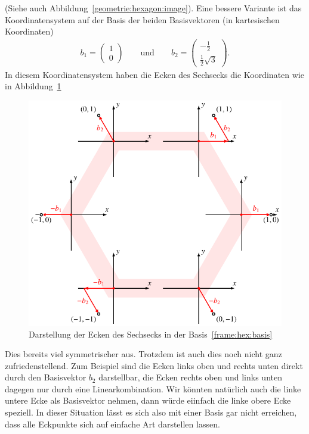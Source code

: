 (Siehe auch Abbildung~\ref{geometrie:hexagon:image}).
Eine bessere Variante ist das Koordinatensystem auf der Basis der beiden
Basisvektoren (in kartesischen Koordinaten)
\begin{equation}
\begin{aligned}
b_1 = \begin{pmatrix} 1\\0\end{pmatrix}
\qquad
\text{und}
\qquad
b_2 = \begin{pmatrix} -\frac12\\\frac12\sqrt{3}\end{pmatrix}.
\end{aligned}
\label{frame:hex:basis}
\end{equation}
In diesem Koordinatensystem haben die Ecken des Sechsecks die Koordinaten
wie in Abbildung~\ref{frame:hex:basisanalyse}
\begin{figure}
\centering
\includegraphics{chapters/1-geometrie/images/hexagon2.pdf}
\caption{Darstellung der Ecken des Sechsecks in der
Basis~\eqref{frame:hex:basis}
\label{frame:hex:basisanalyse}}
\end{figure}
Dies bereits viel symmetrischer aus.
Trotzdem ist auch dies noch nicht ganz zufriedenstellend. 
Zum Beispiel sind die Ecken links oben und rechts unten direkt durch den
Basisvektor $b_2$ darstellbar, die Ecken rechts oben und links unten
dagegen nur durch eine Linearkombination.
Wir könnten natürlich auch die linke untere Ecke als Basisvektor nehmen,
dann würde eiinfach die linke obere Ecke speziell.
In dieser Situation lässt es sich also mit einer Basis gar nicht erreichen,
dass alle Eckpunkte sich auf einfache Art darstellen lassen.

